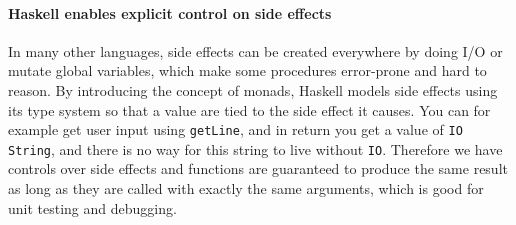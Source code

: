 \documentclass[11pt,a4paper]{article}
\begin{document}
\paragraph{Haskell enables explicit control on side effects}
In many other languages, side effects can be created everywhere
by doing I/O or mutate global variables, which make some procedures
error-prone and hard to reason.
By introducing the concept of monads, Haskell models side effects using
its type system so that a value are tied to the side effect it causes.
You can for example get user input using \texttt{getLine}, and in return
you get a value of \texttt{IO String}, and there is no way for this string
to live without \texttt{IO}.  
Therefore we have controls over side effects and
functions are guaranteed to produce the same result
as long as they are called with exactly the same arguments,
which is good for unit testing and debugging.
\end{document}
